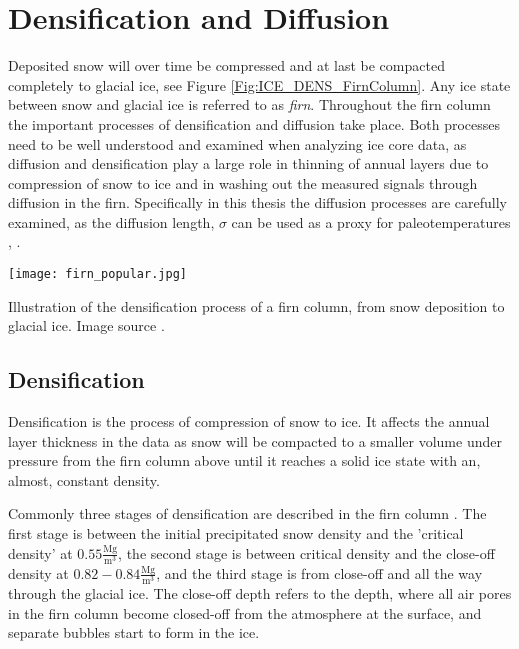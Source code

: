 \documentclass[../../CompleteThesis2/Complete_2ndDraft]{subfiles}
\begin{document}


\section[Densification and Diffusion][Densification and Diffusion]{Densification and Diffusion}
\label{Sec:Ice_DensificationAndDiffusion}
Deposited snow will over time be compressed and at last be compacted completely to glacial ice, see Figure \ref{Fig:ICE_DENS_FirnColumn}. Any ice state between snow and glacial ice is referred to as \textit{firn}. Throughout the firn column the important processes of densification and diffusion take place. Both processes need to be well understood and examined when analyzing ice core data, as diffusion and densification play a large role in thinning of annual layers due to compression of snow to ice and in washing out the measured signals through diffusion in the firn. Specifically in this thesis the diffusion processes are carefully examined, as the diffusion length, $\sigma$ can be used as a proxy for paleotemperatures \cite{Holme2018}, \cite{Kahle2018}.

\begin{marginfigure}
	\centering
	\texttt{[image: firn\_popular.jpg]}
	\caption[Densification process]{\footnotesize Illustration of the densification process of a firn column, from snow deposition to glacial ice. Image source \cite{Blunier2000}.}
	\label{Fig:ICE_DENS_FirnColumn}
\end{marginfigure}

\subsection[Densification][Densification]{Densification}
\label{Subsec:Ice_DiffusionAndDensification_Densification}
Densification is the process of compression of snow to ice. It affects the annual layer thickness in the data as snow will be compacted to a smaller volume under pressure from the firn column above until it reaches a solid ice state with an, almost, constant density.

Commonly three stages of densification are described in the firn column \cite[M. Herron and C. Langway, 1980]{HerronLangway1980}. The first stage is between the initial precipitated snow density and the 'critical density' at $0.55 \frac{\text{Mg}}{\text{m}^3}$, the second stage is between critical density and the close-off density at $0.82-0.84 \frac{\text{Mg}}{\text{m}^3}$, and the third stage is from close-off and all the way through the glacial ice. The close-off depth refers to the depth, where all air pores in the firn column become closed-off from the atmosphere at the surface, and separate bubbles start to form in the ice.
\end{document}
